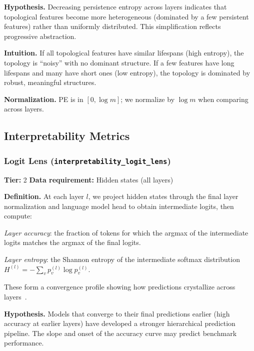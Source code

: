 \documentclass{article}
\begin{document}
\textbf{Hypothesis.}
Decreasing persistence entropy across layers indicates that topological features become more heterogeneous (dominated by a few persistent features) rather than uniformly distributed. This simplification reflects progressive abstraction.

\textbf{Intuition.}
If all topological features have similar lifespans (high entropy), the topology is ``noisy'' with no dominant structure. If a few features have long lifespans and many have short ones (low entropy), the topology is dominated by robust, meaningful structures.

\textbf{Normalization.} PE is in $[0, \log m]$; we normalize by $\log m$ when comparing across layers.

\subsection{Interpretability Metrics}
\label{app:interpretability}

\subsubsection{Logit Lens (\texttt{interpretability\_logit\_lens})}
\label{app:logit-lens}

\textbf{Tier:} 2 \quad \textbf{Data requirement:} Hidden states (all layers)

\textbf{Definition.}
At each layer $l$, we project hidden states through the final layer normalization and language model head to obtain intermediate logits, then compute:

\emph{Layer accuracy}: the fraction of tokens for which the argmax of the intermediate logits matches the argmax of the final logits.

\emph{Layer entropy}: the Shannon entropy of the intermediate softmax distribution $H^{(l)} = -\sum_v p_v^{(l)} \log p_v^{(l)}$.

These form a convergence profile showing how predictions crystallize across layers~\citep{nostalgebraist2020logitlens}.

\textbf{Hypothesis.}
Models that converge to their final predictions earlier (high accuracy at earlier layers) have developed a stronger hierarchical prediction pipeline. The slope and onset of the accuracy curve may predict benchmark performance.
\end{document}

